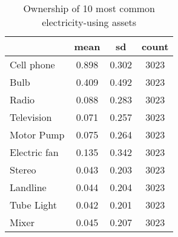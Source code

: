 \begin{table}[htbp]\centering
\def\sym#1{\ifmmode^{#1}\else\(^{#1}\)\fi}
\caption{Ownership of 10 most common electricity-using assets \label{tab:"label"}}
\begin{tabular*}{0.9\hsize}{@{\hskip\tabcolsep\extracolsep\fill}l*{1}{ccc}}
\toprule
                                &     mean&       sd&    count\\
\midrule
Cell phone                      &    0.898&    0.302&     3023\\
Bulb                            &    0.409&    0.492&     3023\\
Radio                           &    0.088&    0.283&     3023\\
Television                      &    0.071&    0.257&     3023\\
Motor Pump                      &    0.075&    0.264&     3023\\
Electric fan                    &    0.135&    0.342&     3023\\
Stereo                          &    0.043&    0.203&     3023\\
Landline                        &    0.044&    0.204&     3023\\
Tube Light                      &    0.042&    0.201&     3023\\
Mixer                           &    0.045&    0.207&     3023\\
\bottomrule
\end{tabular*}
\end{table}
